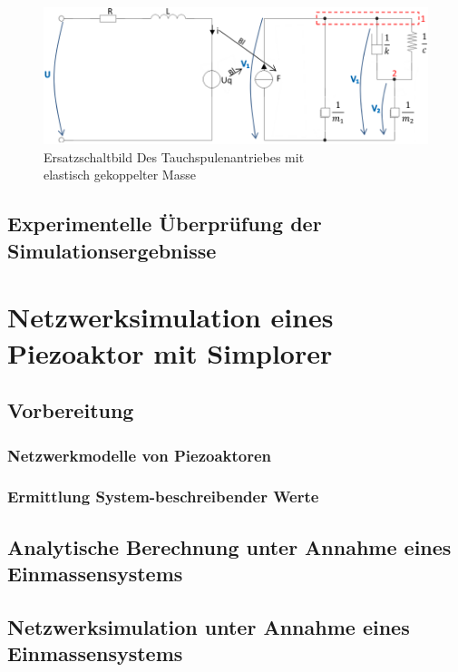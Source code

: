 \documentclass[12pt,a4paper,bibliography=totocnumbered,listof=totocnumbered]{scrartcl}
\begin{document}
\begin{figure}[h]
\centering
\includegraphics[width=0.7\linewidth]{Bilder/SchaltungTauchspuleAufgabe6_3.png}
\caption[]{Ersatzschaltbild Des Tauchspulenantriebes mit \\ elastisch gekoppelter Masse}
\label{fig:Schaltung6.3}
\end{figure}

\subsection{Experimentelle Überprüfung der Simulationsergebnisse}

\pagebreak{}
\section{Netzwerksimulation eines Piezoaktor mit Simplorer}

\subsection{Vorbereitung}

\subsubsection{Netzwerkmodelle von Piezoaktoren}

\subsubsection{Ermittlung System-beschreibender Werte}

\subsection{Analytische Berechnung unter Annahme eines Einmassensystems}

\subsection{Netzwerksimulation unter Annahme eines Einmassensystems}
\end{document}
